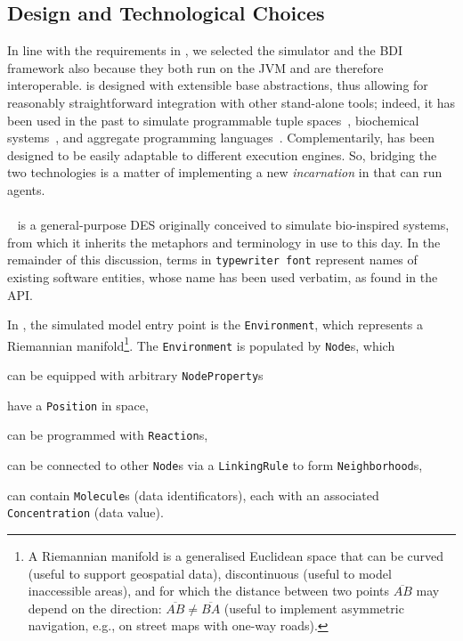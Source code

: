 
\subsection{Design and Technological Choices}
\label{ssec:simulation:choices}
In line with the requirements in ,
we selected the \alchemist{} simulator
and the \jakta{} \ac{BDI} framework
also because they both run on the \ac{JVM} and are therefore interoperable.
%
\alchemist{} is designed with extensible base abstractions,
thus allowing for reasonably straightforward integration with other stand-alone tools;
indeed,
it has been used in the past to simulate programmable tuple spaces~\cite{zambonelli2015percom},
biochemical systems~\cite{MontagnaSAC2012},
and aggregate programming languages~\cite{PianiniSAC2015,DBLP:journals/softx/CasadeiVAP22}.
%
Complementarily,
\jakta{} has been designed to be easily adaptable to different execution engines.
%
So,
bridging the two technologies is a matter of implementing a new \emph{incarnation} in \alchemist{}
that can run \jakta{} agents.
%

\paragraph{\alchemist{}}

\alchemist{}~\cite{PianiniJOS2013} is a general-purpose \ac{DES}
originally conceived to simulate bio-inspired systems,
from which it inherits the metaphors and terminology in use to this day.
%
In the remainder of this discussion,
terms in \texttt{typewriter font} represent names of existing software entities,
whose name has been used verbatim, as found in the \ac{API}.

In \alchemist,
the simulated model entry point is the \texttt{Environment},
which represents a Riemannian manifold\footnote{A Riemannian manifold is
a generalised Euclidean space that can be curved
(useful to support geospatial data),
discontinuous
(useful to model inaccessible areas),
and for which the distance between two points $\overline{AB}$ may depend on the direction: $\overline{AB}\neq\overline{BA}$
(useful to implement asymmetric navigation, e.g., on street maps with one-way roads).}.
%
The \texttt{Environment} is populated by \texttt{Node}s, which
\begin{inlinelist}
    \item can be equipped with arbitrary \texttt{NodeProperty}s
    \item have a \texttt{Position} in space,
    \item can be programmed with \texttt{Reaction}s,
    \item can be connected to other \texttt{Node}s via a \texttt{LinkingRule} to form \texttt{Neighborhood}s,
    \item can contain \texttt{Molecule}s (data identificators),
    each with an associated \texttt{Concentration} (data value).
\end{inlinelist}

